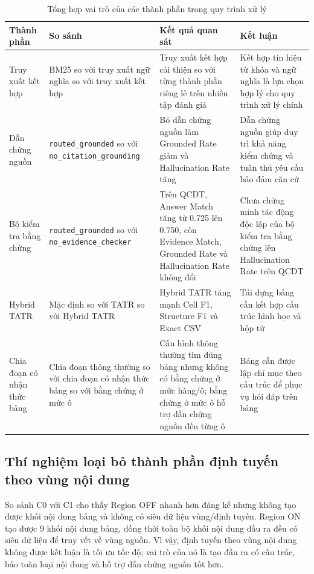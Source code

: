 \documentclass[../DoAn.tex]{subfiles}
\begin{document}
\begin{table}[H]
\centering
\caption{Tổng hợp vai trò của các thành phần trong quy trình xử lý}
\label{tab:component-ablation-summary}

\footnotesize
\begin{tabularx}{\textwidth}{|
>{\raggedright\arraybackslash}p{}|
>{\raggedright\arraybackslash}p{}|
>{\raggedright\arraybackslash}X|
>{\raggedright\arraybackslash}p{}|
}
\hline
\textbf{Thành phần} & \textbf{So sánh} & \textbf{Kết quả quan sát} & \textbf{Kết luận} \\
\hline
Truy xuất kết hợp & BM25 so với truy xuất ngữ nghĩa so với truy xuất kết hợp & Truy xuất kết hợp cải thiện so với từng thành phần riêng lẻ trên nhiều tập đánh giá & Kết hợp tín hiệu từ khóa và ngữ nghĩa là lựa chọn hợp lý cho quy trình xử lý chính \\
\hline
Dẫn chứng nguồn & \texttt{routed\_grounded} so với \texttt{no\_citation\_grounding} & Bỏ dẫn chứng nguồn làm Grounded Rate giảm và Hallucination Rate tăng & Dẫn chứng nguồn giúp duy trì khả năng kiểm chứng và tuân thủ yêu cầu bảo đảm căn cứ \\
\hline
Bộ kiểm tra bằng chứng & \texttt{routed\_grounded} so với \texttt{no\_evidence\_checker} & Trên QCDT, Answer Match tăng từ 0.725 lên 0.750, còn Evidence Match, Grounded Rate và Hallucination Rate không đổi & Chưa chứng minh tác động độc lập của bộ kiểm tra bằng chứng lên Hallucination Rate trên QCDT \\
\hline
Hybrid TATR & Mặc định so với TATR so với Hybrid TATR & Hybrid TATR tăng mạnh Cell F1, Structure F1 và Exact CSV & Tái dựng bảng cần kết hợp cấu trúc hình học và hộp từ \\
\hline
Chia đoạn có nhận thức bảng & Chia đoạn thông thường so với chia đoạn có nhận thức bảng so với bằng chứng ở mức ô & Cấu hình thông thường tìm đúng bảng nhưng không có bằng chứng ở mức hàng/ô; bằng chứng ở mức ô hỗ trợ dẫn chứng nguồn đến từng ô & Bảng cần được lập chỉ mục theo cấu trúc để phục vụ hỏi đáp trên bảng \\
\hline
\end{tabularx}
\end{table}

\subsection{Thí nghiệm loại bỏ thành phần định tuyến theo vùng nội dung}

So sánh C0 với C1 cho thấy Region OFF nhanh hơn đáng kể nhưng không tạo được khối nội dung bảng và không có siêu dữ liệu vùng/định tuyến. Region ON tạo được 9 khối nội dung bảng, đồng thời toàn bộ khối nội dung đầu ra đều có siêu dữ liệu để truy vết về vùng nguồn. Vì vậy, định tuyến theo vùng nội dung không được kết luận là tối ưu tốc độ; vai trò của nó là tạo đầu ra có cấu trúc, bảo toàn loại nội dung và hỗ trợ dẫn chứng nguồn tốt hơn.
\end{document}
